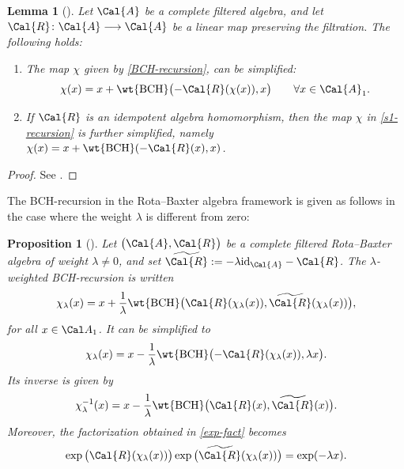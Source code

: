 \documentclass[pdftex]{sigma}
\numberwithin{equation}{section}
\newtheorem{Lemma}[Theorem]{Lemma}
\newtheorem{Proposition}[Theorem]{Proposition}
 { \theoremstyle{definition}
\newtheorem{Definition}[Theorem]{Definition}
\newtheorem{Note}[Theorem]{Note}
\newtheorem{Example}[Theorem]{Example}
\newtheorem{Remark}[Theorem]{Remark} }
\begin{document}
\begin{Lemma}[\cite{KLM06}]
Let $\Cal{A}$ be a complete filtered algebra, and let $\Cal{R}\colon \Cal{A} \longrightarrow \Cal{A}$ be a linear map preserving the filtration. The following holds:
\begin{enumerate}\itemsep=0pt
\item[$1.$] The map $\chi$ given by \eqref{BCH-recursion}, can be simplified:
\begin{equation}\label{s1-recursion}
\chi(x) = x + \wt{{\rm BCH}}\big({-}\Cal{R}(\chi(x)), x \big) \qquad \forall x \in \Cal{A}_1.
\end{equation}
\item[$2.$] If $\Cal{R}$ is an idempotent algebra homomorphism, then the map $\chi$ in \eqref{s1-recursion} is further simplified, namely $\chi(x) = x + \wt{{\rm BCH}}(-\Cal{R}(x), x)$.
\end{enumerate}
\end{Lemma}

\begin{proof}
See \cite[Lemmas 6 and 7]{KLM06}.
\end{proof}

The BCH-recursion in the Rota--Baxter algebra framework is given as follows in the case where the weight $\lambda$ is different from zero:

\begin{Proposition}[{\cite[Proposition 11]{KLM06}}]
Let $\big(\Cal{A}, \Cal{R}\big)$ be a complete filtered Rota--Baxter algebra of weight $\lambda\neq 0$, and set $\widetilde{\Cal{R}} := -\lambda {\rm id}_{\Cal{A}}- \Cal{R}$. The $\lambda$-weighted BCH-recursion is written
\begin{equation}
\label{chi-lambda-rec}
\chi_{\lambda}(x)
= x + \frac{1}{\lambda} \wt{{\rm BCH}}\big(\Cal{R}(\chi_{\lambda}(x)),
\widetilde{\Cal{R}}(\chi_{\lambda}(x))\big),
\end{equation}
for all $x\in\Cal A_1$. It can be simplified to
\begin{equation*}
\chi_{\lambda}(x)
= x - \frac{1}{\lambda} \wt{{\rm BCH}}\big({-}\Cal{R}(\chi_{\lambda}(x)), \lambda x\big).
\end{equation*}
Its inverse is given by
\begin{equation*}
\chi_{\lambda}^{-1}(x)
= x - \frac{1}{\lambda} \wt{{\rm BCH}}\big(\Cal{R}(x), \widetilde{\Cal{R}}(x)\big).
\end{equation*}
Moreover, the factorization obtained in \eqref{exp-fact} becomes
\begin{equation}
\label{exp-moins-lambda-x}
\exp\big(\Cal{R}(\chi_{\lambda}(x))\big)\exp\big(\widetilde{\Cal{R}}
(\chi_{\lambda}(x))\big) = \exp(-\lambda x).
\end{equation}
\end{Proposition}
\end{document}
